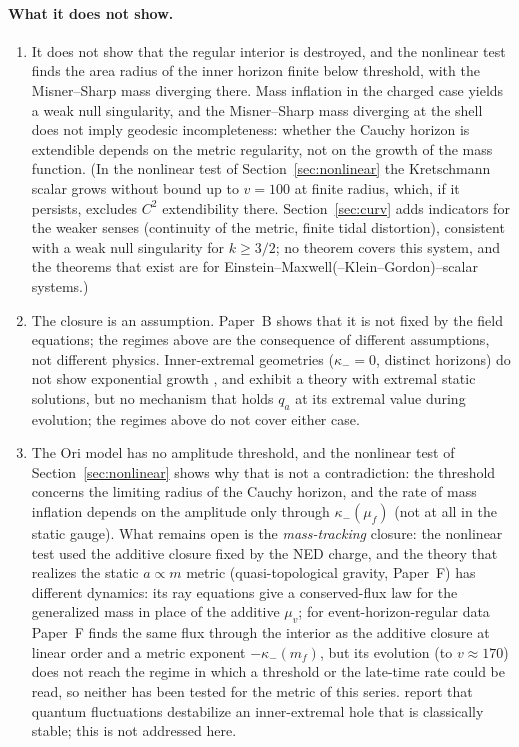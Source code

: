 \documentclass[11pt]{article}
\begin{document}
\paragraph{What it does not show.}
\begin{enumerate}
\item It does not show that the regular interior is destroyed, and the nonlinear test finds the area radius of the inner horizon finite below threshold, with the Misner--Sharp mass diverging there. Mass inflation in the charged case yields a weak null singularity, and the Misner--Sharp mass diverging at the shell does not imply geodesic incompleteness: whether the Cauchy horizon is extendible depends on the metric regularity, not on the growth of the mass function. (In the nonlinear test of Section~\ref{sec:nonlinear} the Kretschmann scalar grows without bound up to $v=100$ at finite radius, which, if it persists, excludes $C^2$ extendibility there. Section~\ref{sec:curv} adds indicators for the weaker senses (continuity of the metric, finite tidal distortion), consistent with a weak null singularity for $k\ge3/2$; no theorem covers this system, and the theorems that exist \citep{Dafermos2005,VanDeMoortel2020} are for Einstein--Maxwell(--Klein--Gordon)--scalar systems.)
\item The closure is an assumption. Paper~B shows that it is not fixed by the field equations; the regimes above are the consequence of different assumptions, not different physics. Inner-extremal geometries ($\kappa_-=0$, distinct horizons) do not show exponential growth \citep{CarballoRubio2022b}, and \citet{EichhornFernandes2025} exhibit a theory with extremal static solutions, but no mechanism that holds $q_a$ at its extremal value during evolution; the regimes above do not cover either case.
\item The Ori model has no amplitude threshold, and the nonlinear test of Section~\ref{sec:nonlinear} shows why that is not a contradiction: the threshold concerns the limiting radius of the Cauchy horizon, and the rate of mass inflation depends on the amplitude only through $\kappa_-(\mu_f)$ (not at all in the static gauge). What remains open is the \emph{mass-tracking} closure: the nonlinear test used the additive closure fixed by the NED charge, and the theory that realizes the static $a\propto m$ metric (quasi-topological gravity, Paper~F) has different dynamics: its ray equations give a conserved-flux law for the generalized mass in place of the additive $\mu_v$; for event-horizon-regular data Paper~F finds the same flux through the interior as the additive closure at linear order and a metric exponent $-\kappa_-(m_f)$, but its evolution (to $v\approx170$) does not reach the regime in which a threshold or the late-time rate could be read, so neither has been tested for the metric of this series. \citet{KhodadiFirouzjaee2024} report that quantum fluctuations destabilize an inner-extremal hole that is classically stable; this is not addressed here.

\end{enumerate}
\end{document}
